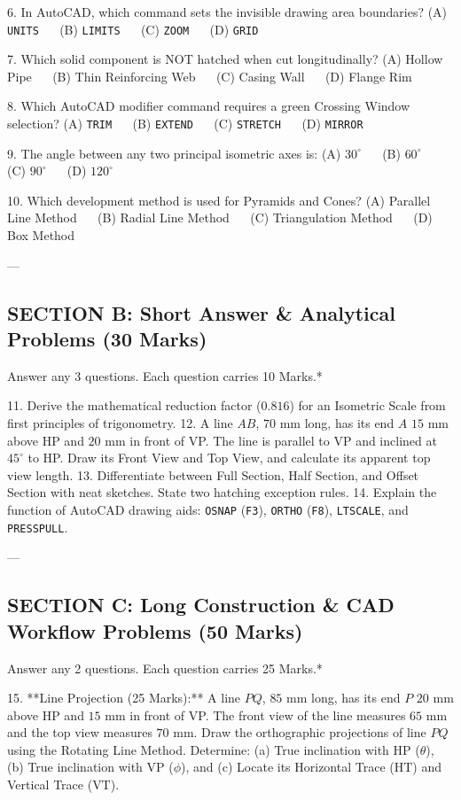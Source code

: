 6. In AutoCAD, which command sets the invisible drawing area boundaries?  
   (A) \texttt{UNITS} $\quad$ (B) \texttt{LIMITS} $\quad$ (C) \texttt{ZOOM} $\quad$ (D) \texttt{GRID}

7. Which solid component is NOT hatched when cut longitudinally?  
   (A) Hollow Pipe $\quad$ (B) Thin Reinforcing Web $\quad$ (C) Casing Wall $\quad$ (D) Flange Rim

8. Which AutoCAD modifier command requires a green Crossing Window selection?  
   (A) \texttt{TRIM} $\quad$ (B) \texttt{EXTEND} $\quad$ (C) \texttt{STRETCH} $\quad$ (D) \texttt{MIRROR}

9. The angle between any two principal isometric axes is:  
   (A) $30^\circ$ $\quad$ (B) $60^\circ$ $\quad$ (C) $90^\circ$ $\quad$ (D) $120^\circ$

10. Which development method is used for Pyramids and Cones?  
    (A) Parallel Line Method $\quad$ (B) Radial Line Method $\quad$ (C) Triangulation Method $\quad$ (D) Box Method

---

\subsection{SECTION B: Short Answer \& Analytical Problems (30 Marks)}
\noindent *Answer any 3 questions. Each question carries 10 Marks.*

11. Derive the mathematical reduction factor ($0.816$) for an Isometric Scale from first principles of trigonometry.
12. A line $AB$, $70\text{ mm}$ long, has its end $A$ $15\text{ mm}$ above HP and $20\text{ mm}$ in front of VP. The line is parallel to VP and inclined at $45^\circ$ to HP. Draw its Front View and Top View, and calculate its apparent top view length.
13. Differentiate between Full Section, Half Section, and Offset Section with neat sketches. State two hatching exception rules.
14. Explain the function of AutoCAD drawing aids: \texttt{OSNAP} (\texttt{F3}), \texttt{ORTHO} (\texttt{F8}), \texttt{LTSCALE}, and \texttt{PRESSPULL}.

---

\subsection{SECTION C: Long Construction \& CAD Workflow Problems (50 Marks)}
\noindent *Answer any 2 questions. Each question carries 25 Marks.*

15. **Line Projection (25 Marks):**  
    A line $PQ$, $85\text{ mm}$ long, has its end $P$ $20\text{ mm}$ above HP and $15\text{ mm}$ in front of VP. The front view of the line measures $65\text{ mm}$ and the top view measures $70\text{ mm}$. Draw the orthographic projections of line $PQ$ using the Rotating Line Method. Determine: (a) True inclination with HP ($\theta$), (b) True inclination with VP ($\phi$), and (c) Locate its Horizontal Trace ($\text{HT}$) and Vertical Trace ($\text{VT}$).

